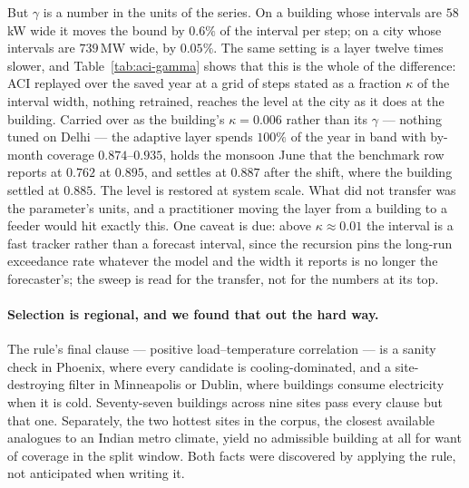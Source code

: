 But $\gamma$ is a number in the units of the series. On a building whose
intervals are $58$\,kW wide it moves the bound by $0.6\%$ of the interval per
step; on a city whose intervals are $739$\,MW wide, by $0.05\%$. The same
setting is a layer twelve times slower, and Table~\ref{tab:aci-gamma} shows
that this is the whole of the difference: ACI replayed over the saved year at a
grid of steps stated as a fraction $\kappa$ of the interval width, nothing
retrained, reaches the level at the city as it does at the building. Carried
over as the building's $\kappa=0.006$ rather than its $\gamma$ --- nothing
tuned on Delhi --- the adaptive layer spends $100\%$ of the year in band with
by-month coverage $0.874$--$0.935$, holds the monsoon June that the benchmark
row reports at $0.762$ at $0.895$, and settles at $0.887$ after the shift,
where the building settled at $0.885$. The level is restored at system scale.
What did not transfer was the parameter's units, and a practitioner moving the
layer from a building to a feeder would hit exactly this. One caveat is due:
above $\kappa\approx0.01$ the interval is a fast tracker rather than a
forecast interval, since the recursion pins the long-run exceedance rate
whatever the model and the width it reports is no longer the forecaster's; the
sweep is read for the transfer, not for the numbers at its top.

\paragraph{Selection is regional, and we found that out the hard way.} The
rule's final clause --- positive load--temperature correlation --- is a sanity
check in Phoenix, where every candidate is cooling-dominated, and a
site-destroying filter in Minneapolis or Dublin, where buildings consume
electricity when it is cold. Seventy-seven buildings across nine sites pass every
clause but that one. Separately, the two hottest sites in the corpus, the closest
available analogues to an Indian metro climate, yield no admissible building at
all for want of coverage in the split window. Both facts were discovered by
applying the rule, not anticipated when writing it.
